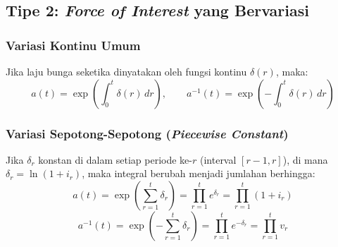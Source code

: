 \documentclass[11pt,a4paper]{article}
\begin{document}
\subsection{Tipe 2: \textit{Force of Interest} yang Bervariasi}

\subsubsection{Variasi Kontinu Umum}
Jika laju bunga seketika dinyatakan oleh fungsi kontinu $\delta(r)$, maka:
\begin{equation}
    a(t) = \exp\left( \int_0^t \delta(r)\,dr \right), \qquad a^{-1}(t) = \exp\left( -\int_0^t \delta(r)\,dr \right)
\end{equation}

\subsubsection{Variasi Sepotong-Sepotong (\textit{Piecewise Constant})}
Jika $\delta_r$ konstan di dalam setiap periode ke-$r$ (interval $[r-1, r]$), di mana $\delta_r = \ln(1 + i_r)$, maka integral berubah menjadi jumlahan berhingga:
\begin{equation}
    a(t) = \exp\left( \sum_{r=1}^t \delta_r \right) = \prod_{r=1}^t e^{\delta_r} = \prod_{r=1}^t (1 + i_r)
\end{equation}
\begin{equation}
    a^{-1}(t) = \exp\left( -\sum_{r=1}^t \delta_r \right) = \prod_{r=1}^t e^{-\delta_r} = \prod_{r=1}^t v_r
\end{equation}
\end{document}
